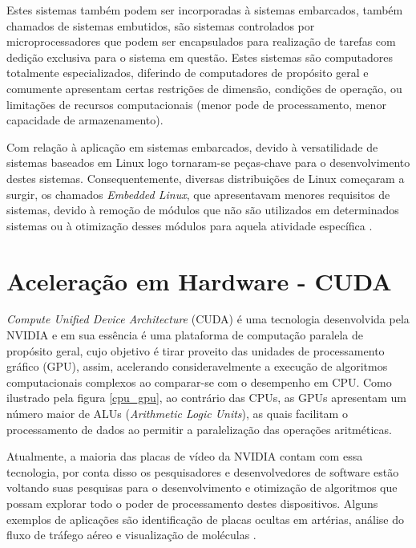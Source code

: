 Estes sistemas também podem ser incorporadas à sistemas embarcados, também chamados de sistemas embutidos, são sistemas controlados por microprocessadores que podem ser encapsulados para realização de tarefas com dedição exclusiva para o sistema em questão. Estes sistemas são computadores totalmente especializados, diferindo de computadores de propósito geral e comumente apresentam certas restrições de dimensão, condições de operação, ou limitações de recursos computacionais (menor pode de processamento, menor capacidade de armazenamento).

Com relação à aplicação em sistemas embarcados, devido à versatilidade de sistemas baseados em Linux logo tornaram-se peças-chave para o desenvolvimento destes sistemas. Consequentemente, diversas distribuições de Linux começaram a surgir, os chamados \textit{Embedded Linux}, que apresentavam menores requisitos de sistemas, devido à remoção de módulos que não são utilizados em determinados sistemas ou à otimização desses módulos para aquela atividade específica \cite{Yaghmour2008}.

\section{Aceleração em Hardware - CUDA}
\label{cuda}

\textit{Compute Unified Device Architecture} (CUDA) é uma tecnologia desenvolvida pela NVIDIA e em sua essência é uma plataforma de computação paralela de propósito geral, cujo objetivo é tirar proveito das unidades de processamento gráfico (GPU), assim, acelerando consideravelmente a execução de algoritmos computacionais complexos ao comparar-se com o desempenho em CPU. Como ilustrado pela figura \ref{cpu_gpu}, ao contrário das CPUs, as GPUs apresentam um número maior de ALUs (\textit{Arithmetic Logic Units}), as quais facilitam o processamento de dados ao permitir a paralelização das operações aritméticas.

Atualmente, a maioria das placas de vídeo da NVIDIA contam com essa tecnologia, por conta disso os pesquisadores e desenvolvedores de software estão voltando suas pesquisas para o desenvolvimento e otimização de algoritmos que possam explorar todo o poder de processamento destes dispositivos. Alguns exemplos de aplicações são identificação de placas ocultas em artérias, análise do fluxo de tráfego aéreo \cite{Monish2011} e visualização de moléculas \cite{Stone2015}.

